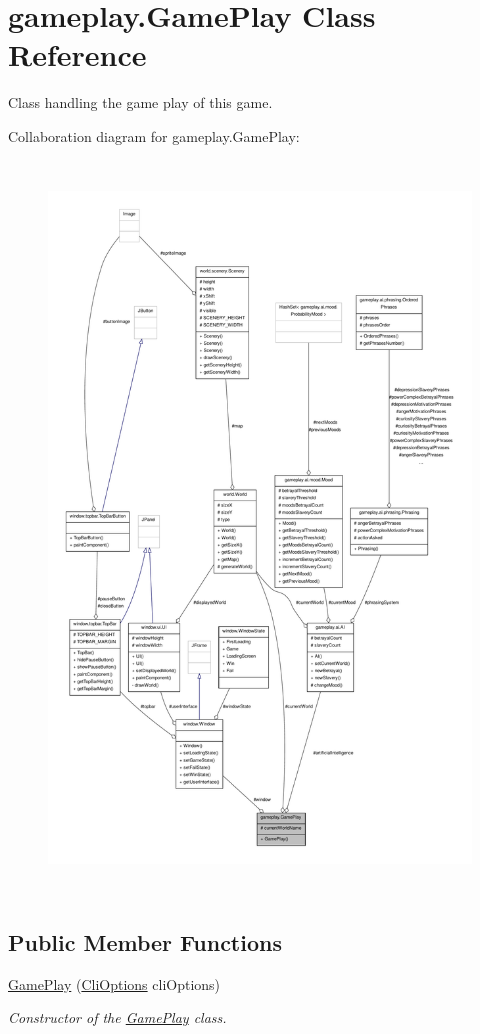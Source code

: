 \hypertarget{a00010}{\section{gameplay.\-Game\-Play Class Reference}
\label{a00010}
}


Class handling the game play of this game.  




Collaboration diagram for gameplay.\-Game\-Play\-:
\nopagebreak
\begin{figure}[H]
\begin{center}
\leavevmode
\includegraphics[height=550pt]{a00097}
\end{center}
\end{figure}
\subsection*{Public Member Functions}
\begin{DoxyCompactItemize}
\item 
\hyperlink{a00010_acaa399a84e39a11a776da53da43ed3ea}{Game\-Play} (\hyperlink{a00006}{Cli\-Options} cli\-Options)
\begin{DoxyCompactList}\small\item\em Constructor of the \hyperlink{a00010}{Game\-Play} class. \end{DoxyCompactList}\end{DoxyCompactItemize}
